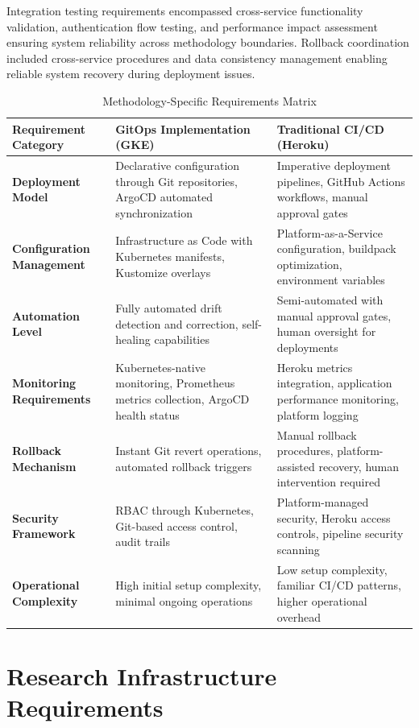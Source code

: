Integration testing requirements encompassed cross-service functionality validation, authentication flow testing, and performance impact assessment ensuring system reliability across methodology boundaries. Rollback coordination included cross-service procedures and data consistency management enabling reliable system recovery during deployment issues.
\begin{table}[H]
\centering
\small
\begin{tabular}{|p{2.5cm}|p{5cm}|p{5cm}|}
\hline
\textbf{Requirement Category} & \textbf{GitOps Implementation (GKE)} & \textbf{Traditional CI/CD (Heroku)} \\
\hline
\textbf{Deployment Model} & Declarative configuration through Git repositories, ArgoCD automated synchronization & Imperative deployment pipelines, GitHub Actions workflows, manual approval gates \\
\hline
\textbf{Configuration Management} & Infrastructure as Code with Kubernetes manifests, Kustomize overlays & Platform-as-a-Service configuration, buildpack optimization, environment variables \\
\hline
\textbf{Automation Level} & Fully automated drift detection and correction, self-healing capabilities & Semi-automated with manual approval gates, human oversight for deployments \\
\hline
\textbf{Monitoring Requirements} & Kubernetes-native monitoring, Prometheus metrics collection, ArgoCD health status & Heroku metrics integration, application performance monitoring, platform logging \\
\hline
\textbf{Rollback Mechanism} & Instant Git revert operations, automated rollback triggers & Manual rollback procedures, platform-assisted recovery, human intervention required \\
\hline
\textbf{Security Framework} & RBAC through Kubernetes, Git-based access control, audit trails & Platform-managed security, Heroku access controls, pipeline security scanning \\
\hline
\textbf{Operational Complexity} & High initial setup complexity, minimal ongoing operations & Low setup complexity, familiar CI/CD patterns, higher operational overhead \\
\hline
\end{tabular}
\caption{Methodology-Specific Requirements Matrix}
\label{tab:methodology-requirements-matrix}
\end{table}


\section{Research Infrastructure Requirements}

